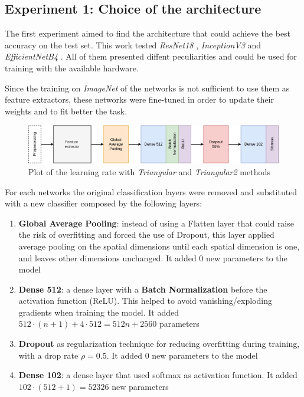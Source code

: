 \subsection{Experiment 1: Choice of the architecture}\label{sec:exp1}
The first experiment aimed to find the architecture that could achieve the best accuracy on the test set. This work tested \textit{ResNet18} \cite{he2015deep}, \textit{InceptionV3} \cite{szegedy2015going} and 
\textit{EfficientNetB4} \cite{tan2019efficientnet}. All of them presented diffent peculiarities and could be used for training with the available hardware. \par
Since the training on \textit{ImageNet} of the networks is not sufficient to use them as feature extractors, these networks were fine-tuned in order to update their weights and to fit better the task.
\begin{figure}[ht!]
\centering
\includegraphics[width=1\textwidth]{images/architecture.png} 
\caption{Plot of the learning rate with \emph{Triangular} and \emph{Triangular2} methods}
\label{fig:architecture}
\end{figure}
For each networks the original classification layers were removed and substituted with a new classifier composed by the following layers:
\begin{enumerate}
\item{\textbf{Global Average Pooling}: instead of using a Flatten layer that could raise the risk of overfitting and forced the use of Dropout, this layer applied average pooling on the spatial dimensions until each spatial dimension is one, and leaves other dimensions unchanged. It added 0 new parameters to the model} 
\item{\textbf{Dense 512}: a dense layer with a \textbf{Batch Normalization} before the activation function (ReLU). This helped to avoid vanishing/exploding gradients when training the model. It added $512 \cdot (n+1) + 4\cdot512 = 512n + 2560$ parameters}
\item{\textbf{Dropout} as regularization technique for reducing overfitting during training, with a drop rate $\rho=0.5$. It added 0 new parameters to the model}
\item{\textbf{Dense 102}: a dense layer that used softmax as activation function. It added  $102 \cdot (512+1) = 52326$ new parameters}
\end{enumerate}

